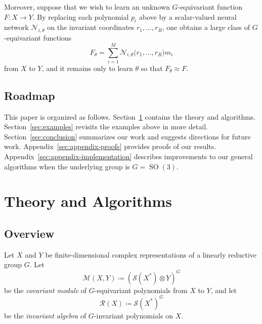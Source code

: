 \documentclass[11pt]{article}
\newcommand{\scM}{\mathcal{M}}
\newcommand{\scN}{\mathcal{N}}
\newcommand{\scR}{\mathcal{R}}
\newcommand{\scS}{\mathcal{S}}
\newcommand{\SO}{\operatorname{SO}}
\theoremstyle{definition}
\begin{document}
Moreover, suppose that we wish to learn an unknown $G$-equivariant function $F\colon X\to Y$. By replacing each polynomial $p_i$ above by a scalar-valued neural network $\scN_{i,\theta}$ on the invariant coordinates $r_1,\dots,r_R$, one obtains a large class of $G$-equivariant functions
\[
  F_\theta=\sum_{i=1}^M \scN_{i,\theta}\bigl(r_1,\dots,r_R\bigr)m_i
\]
from $X$ to $Y$, and it remains only to learn $\theta$ so that $F_\theta \approx F$.

\subsection{Roadmap}

This paper is organized as follows. Section~\ref{sec:theory-and-algorithms} contains the theory and algorithms. Section~\ref{sec:examples} revisits the examples above in more detail. Section~\ref{sec:conclusion} summarizes our work and suggests directions for future work. Appendix~\ref{sec:appendix-proofs} provides proofs of our results. Appendix~\ref{sec:appendix-implementation} describes improvements to our general algorithms when the underlying group is $G = \SO(3)$.

\section{Theory and Algorithms}\label{sec:theory-and-algorithms}

\subsection{Overview}

Let $X$ and $Y$ be finite-dimensional complex representations of a linearly reductive group $G$. Let
\[
  \scM(X,Y)\coloneq\left(\scS(X^*)\otimes Y\right)^G
\]
be the \emph{covariant module} of $G$-equivariant polynomials from $X$ to $Y$, and let
\[
  \scR(X)\coloneq\scS(X^*)^G
\]
be the \emph{invariant algebra} of $G$-invariant polynomials on $X$.
\end{document}
